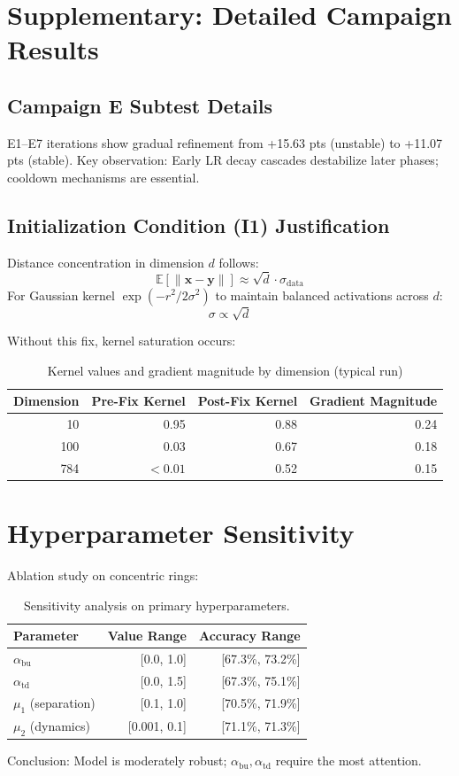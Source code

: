 \documentclass[11pt,a4paper]{article}
\begin{document}
\appendix

\section{Supplementary: Detailed Campaign Results}

\subsection{Campaign E Subtest Details}

E1–E7 iterations show gradual refinement from +15.63 pts (unstable) to +11.07 pts (stable). Key observation: Early LR decay cascades destabilize later phases; cooldown mechanisms are essential.

\subsection{Initialization Condition (I1) Justification}

Distance concentration in dimension $d$ follows:
$$\mathbb{E}[\|\mathbf{x} - \mathbf{y}\|] \approx \sqrt{d} \cdot \sigma_{\text{data}}$$
For Gaussian kernel $\exp(-r^2 / 2\sigma^2)$ to maintain balanced activations across $d$:
$$\sigma \propto \sqrt{d}$$

Without this fix, kernel saturation occurs:
\begin{table}[h]
\centering
\begin{tabular}{rrrr}
\toprule
\textbf{Dimension} & \textbf{Pre-Fix Kernel} & \textbf{Post-Fix Kernel} & \textbf{Gradient Magnitude} \\
\midrule
10 & 0.95 & 0.88 & 0.24 \\
100 & 0.03 & 0.67 & 0.18 \\
784 & $<0.01$ & 0.52 & 0.15 \\
\bottomrule
\end{tabular}
\caption{Kernel values and gradient magnitude by dimension (typical run)}
\end{table}

\section{Hyperparameter Sensitivity}

Ablation study on concentric rings:
\begin{table}[h]
\centering
\begin{tabular}{lrr}
\toprule
\textbf{Parameter} & \textbf{Value Range} & \textbf{Accuracy Range} \\
\midrule
$\alpha_{\text{bu}}$ & [0.0, 1.0] & [67.3\%, 73.2\%] \\
$\alpha_{\text{td}}$ & [0.0, 1.5] & [67.3\%, 75.1\%] \\
$\mu_1$ (separation) & [0.1, 1.0] & [70.5\%, 71.9\%] \\
$\mu_2$ (dynamics) & [0.001, 0.1] & [71.1\%, 71.3\%] \\
\bottomrule
\end{tabular}
\caption{Sensitivity analysis on primary hyperparameters.}
\end{table}

Conclusion: Model is moderately robust; $\alpha_{\text{bu}}, \alpha_{\text{td}}$ require the most attention.
\end{document}
